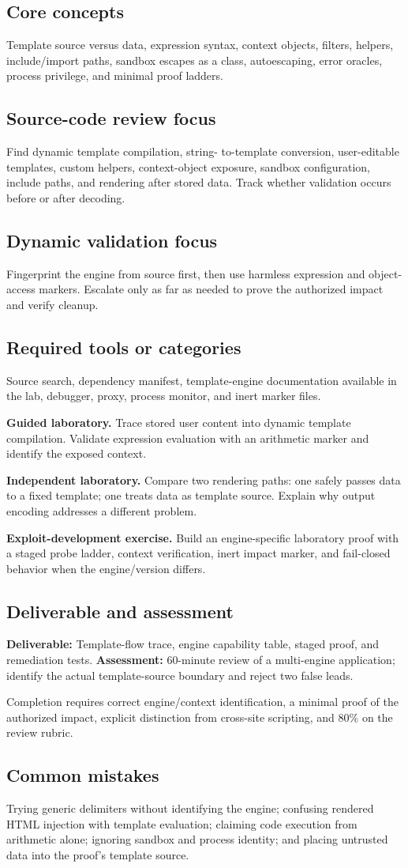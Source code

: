 \documentclass[11pt]{article}
\newcommand{\weekfield}[2]{%
  \Needspace{5\baselineskip}
  \subsection*{#1}
  #2
}
\newcommand{\deliverable}[1]{\textbf{Deliverable:} #1}
\newcommand{\assessment}[1]{\textbf{Assessment:} #1}
\begin{document}
\weekfield{Core concepts}{Template source versus data, expression syntax,
context objects, filters, helpers, include/import paths, sandbox escapes as a
class, autoescaping, error oracles, process privilege, and minimal proof ladders.}

\weekfield{Source-code review focus}{Find dynamic template compilation, string-
to-template conversion, user-editable templates, custom helpers, context-object
exposure, sandbox configuration, include paths, and rendering after stored data.
Track whether validation occurs before or after decoding.}

\weekfield{Dynamic validation focus}{Fingerprint the engine from source first,
then use harmless expression and object-access markers. Escalate only as far as
needed to prove the authorized impact and verify cleanup.}

\weekfield{Required tools or categories}{Source search, dependency manifest,
template-engine documentation available in the lab, debugger, proxy, process
monitor, and inert marker files.}

\begin{labbox}
\textbf{Guided laboratory.} Trace stored user content into dynamic template
compilation. Validate expression evaluation with an arithmetic marker and identify
the exposed context.

\textbf{Independent laboratory.} Compare two rendering paths: one safely passes
data to a fixed template; one treats data as template source. Explain why output
encoding addresses a different problem.

\textbf{Exploit-development exercise.} Build an engine-specific laboratory proof
with a staged probe ladder, context verification, inert impact marker, and
fail-closed behavior when the engine/version differs.
\end{labbox}

\weekfield{Deliverable and assessment}{\deliverable{Template-flow trace, engine
capability table, staged proof, and remediation tests.}
\assessment{60-minute review of a multi-engine application; identify the actual
template-source boundary and reject two false leads.}}

\begin{checkpoints}
Completion requires correct engine/context identification, a minimal proof of the
authorized impact, explicit distinction from cross-site scripting, and 80\% on
the review rubric.
\end{checkpoints}

\weekfield{Common mistakes}{Trying generic delimiters without identifying the
engine; confusing rendered HTML injection with template evaluation; claiming code
execution from arithmetic alone; ignoring sandbox and process identity; and
placing untrusted data into the proof's template source.}
\end{document}
